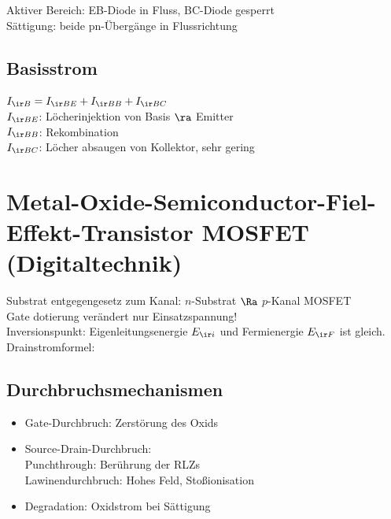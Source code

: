 \documentclass[fs, footer]{latex4ei}
\begin{document}
\begin{multicols*}{4}
Aktiver Bereich: EB-Diode in Fluss, BC-Diode gesperrt\\
Sättigung: beide pn-Übergänge in Flussrichtung\\


\subsection{Basisstrom}
$I_{\ir B} = I_{\ir BE} + I_{\ir BB} + I_{\ir BC}$\\
$I_{\ir BE}$: Löcherinjektion von Basis $\ra$ Emitter\\
$I_{\ir BB}$: Rekombination\\
$I_{\ir BC}$: Löcher absaugen von Kollektor, sehr gering\\



\section{Metal-Oxide-Semiconductor-Fiel-Effekt-Transistor MOSFET (Digitaltechnik)}
Substrat entgegengesetz zum Kanal: $n$-Substrat $\Ra$ $p$-Kanal MOSFET\\
Gate dotierung verändert nur Einsatzspannung!\\
Inversionspunkt: Eigenleitungsenergie $E_{\ir i}$ und Fermienergie $E_{\ir F}$ ist gleich.\\


Drainstromformel:\\

\subsection{Durchbruchsmechanismen}
\begin{itemize}
	\item Gate-Durchbruch: Zerstörung des Oxids
	\item Source-Drain-Durchbruch:\\
		Punchthrough: Berührung der RLZs\\
		Lawinendurchbruch: Hohes Feld, Stoßionisation
	\item Degradation: Oxidstrom bei Sättigung
\end{itemize}


\end{multicols*}
\end{document}
